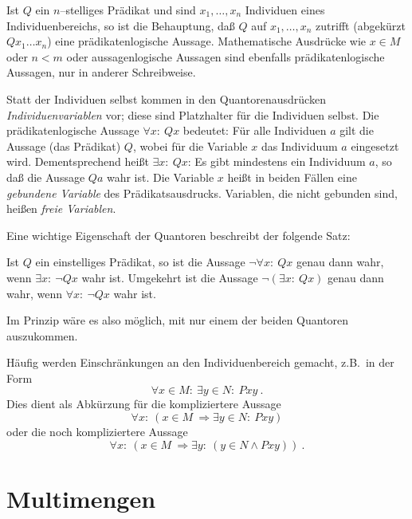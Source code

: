 Ist $Q$ ein $n$--stelliges Prädikat und sind $x_1,\ldots,x_n$ Individuen
eines Individuenbereichs, so ist die Behauptung, daß $Q$ auf $x_1,\ldots,x_n$
zutrifft (ab\-ge\-kürzt $Qx_1\ldots x_n$) eine prädikatenlogische Aussage. 
Mathematische
Ausdrücke wie $x \in M$ oder $n < m$ oder aussagenlogische Aussagen sind
ebenfalls  
prädikatenlogische Aussagen, nur in anderer Schreibweise.  

Statt der Individuen selbst kommen in den
Quantorenausdrücken \emph{Individuenvariablen} vor; diese sind
Platzhalter für die Individuen selbst.  Die prädikatenlogische Aussage
$\forall x:~Qx$
bedeutet: Für alle Individuen $a$ gilt die Aussage (das Prädikat)
$Q$, wobei für die Variable $x$ das Individuum $a$ eingesetzt wird. 
Dementsprechend heißt
$\exists x:~Qx$:
Es gibt mindestens ein Individuum $a$, so daß die Aussage $Qa$ wahr ist.
Die Variable $x$ heißt in beiden Fällen eine \emph{gebundene 
Variable}
des Prädikatsausdrucks.  Variablen, die nicht gebunden sind, heißen
\emph{freie Variablen}.

Eine wichtige Eigenschaft der Quantoren beschreibt der folgende Satz:

\begin{satz}
Ist $Q$ ein einstelliges Prädikat, so ist die Aussage $\neg \forall x:~Qx$
genau dann wahr, wenn $\exists x:~\neg Qx$ wahr ist.  Umgekehrt ist
die Aussage $\neg(\exists x:~Qx)$ genau dann wahr, wenn $\forall x:~\neg
Qx$ wahr ist.
\end{satz}

Im Prinzip wäre es also möglich, mit nur einem der beiden Quantoren
auszukommen.

Häufig werden Einschränkungen an den Individuenbereich gemacht,  z.B.\ 
in der Form
\[ \forall x \in M:~\exists y \in N:\ Pxy\ . \]
Dies dient als Abkürzung für die kompliziertere Aussage
\[ \forall x:~(x \in M\ \Rightarrow \exists y \in N:\ Pxy)\]
oder die noch kompliziertere Aussage
\[ \forall x:~(x \in M\ \Rightarrow \exists y:~(y \in N \wedge Pxy))\ .\]




\section{Multimengen}
\label{sec:multisets}

